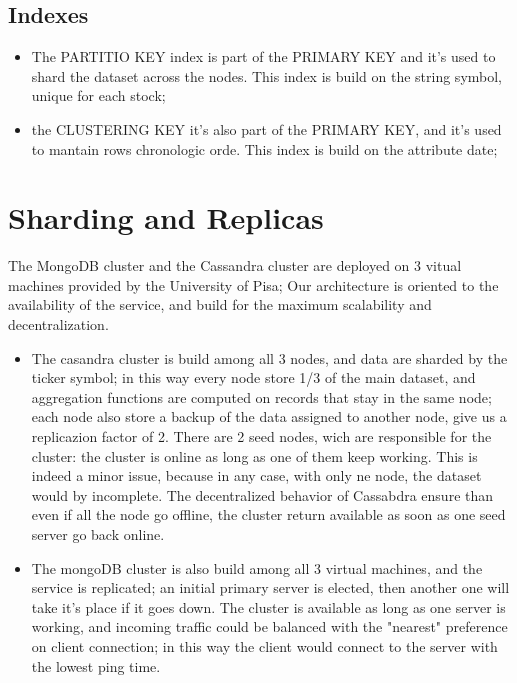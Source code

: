 \subsection{Indexes}
\begin{itemize}
    \item 
The PARTITIO KEY index is part of the PRIMARY KEY and it's used to shard the dataset across
the nodes. This index is build on the string symbol, unique for each stock;
    \item
the CLUSTERING KEY it's also part of the PRIMARY KEY, and it's used to mantain rows 
chronologic orde. This index is build on the attribute date;
\end{itemize}
\section{Sharding and Replicas}
The MongoDB cluster and the Cassandra cluster are deployed on 3 vitual machines provided
by the University of Pisa; 
Our architecture is oriented to the availability of the service, and build for the maximum
scalability and decentralization.
\begin{itemize}
    \item 
The casandra cluster is build among all 3 nodes, and data are sharded by the ticker symbol;
in this way every node store 1/3 of the main dataset, and aggregation functions are computed
on records that stay in the same node; each node also store a backup of the data
assigned to another node, give us a replicazion factor of 2. There are 2 seed nodes,
wich are responsible for the cluster: the cluster is online as long as one of them keep
working. This is indeed a minor issue, because in any case, with only ne node, the dataset 
would by incomplete. The decentralized behavior of Cassabdra ensure than
even if all the node go offline, the cluster return available as soon as one seed server go back
online. 
    \item
The mongoDB cluster is also build among all 3 virtual machines, and the service is replicated;
an initial primary server is elected, then another one will take it's place if it goes down. 
The cluster is available as long as one server is working, and incoming traffic could be balanced
with the "nearest" preference on client connection; in this way the client would connect to the
server with the lowest ping time.

\end{itemize}
